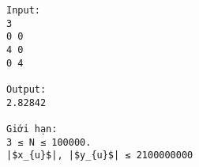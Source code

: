 \begin{verbatim}
Input:
3
0 0
4 0
0 4

Output:
2.82842

Giới hạn:
3 ≤ N ≤ 100000. 
|$x_{u}$|, |$y_{u}$| ≤ 2100000000

\end{verbatim}